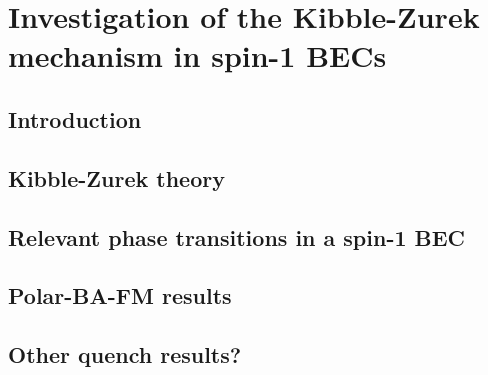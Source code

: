 \chapter{Investigation of the Kibble-Zurek mechanism in spin-1 BECs}

\section{Introduction}

\section{Kibble-Zurek theory}

\section{Relevant phase transitions in a spin-1 BEC}

\section{Polar-BA-FM results}

\section{Other quench results?}
